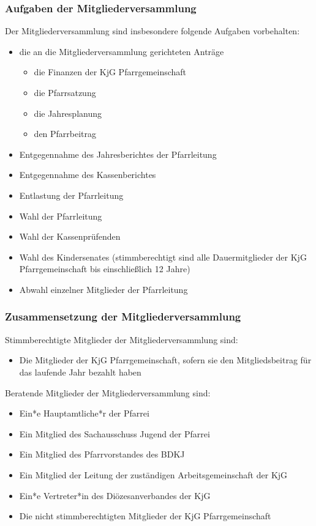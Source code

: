 \documentclass[12pt]{report}
\begin{document}
\begin{flushleft}
\subsubsection{Aufgaben der Mitgliederversammlung}
Der Mitgliederversammlung sind insbesondere folgende Aufgaben vorbehalten:
\begin{itemize}
  \item die an die Mitgliederversammlung gerichteten Anträge
    \begin{itemize}  
      \item die Finanzen der KjG Pfarrgemeinschaft
      \item die Pfarrsatzung
      \item die Jahresplanung
      \item den Pfarrbeitrag
    \end{itemize}
  \item Entgegennahme des Jahresberichtes der Pfarrleitung
  \item Entgegennahme des Kassenberichtes
  \item Entlastung der Pfarrleitung
  \item Wahl der Pfarrleitung
  \item Wahl der Kassenprüfenden
  \item Wahl des Kindersenates (stimmberechtigt sind alle Dauermitglieder der KjG Pfarrgemeinschaft bis einschließlich 12 Jahre)
  \item Abwahl einzelner Mitglieder der Pfarrleitung
\end{itemize}

\subsubsection{Zusammensetzung der Mitgliederversammlung}
Stimmberechtigte Mitglieder der Mitgliederversammlung sind:
\begin{itemize}
  \item Die Mitglieder der KjG Pfarrgemeinschaft, sofern sie den Mitgliedsbeitrag für das laufende Jahr bezahlt haben
\end{itemize}
Beratende Mitglieder der Mitgliederversammlung sind:
\begin{itemize}
  \item Ein*e Hauptamtliche*r der Pfarrei
  \item Ein Mitglied des Sachausschuss Jugend der Pfarrei
  \item Ein Mitglied des Pfarrvorstandes des BDKJ
  \item Ein Mitglied der Leitung der zuständigen Arbeitsgemeinschaft der KjG
  \item Ein*e Vertreter*in des Diözesanverbandes der KjG
  \item Die nicht stimmberechtigten Mitglieder der KjG Pfarrgemeinschaft


\end{itemize}
\end{flushleft}
\end{document}

